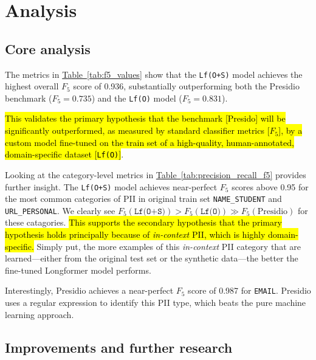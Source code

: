 \documentclass[11pt]{article}
\newcommand{\Tablink}[1]{\hyperref[#1]{Table~\ref*{#1}}}
\begin{document}
\section{Analysis} 

\subsection{Core analysis}

The metrics in \Tablink{tab:f5_values} show that the \texttt{Lf(O+S)} model achieves the highest overall $F_5$ score of 0.936, substantially outperforming both the Presidio benchmark ($F_5 = 0.735$) and the \texttt{Lf(O)} model ($F_5 = 0.831$).

\hl{This validates the primary hypothesis that the benchmark [Presido] will be significantly outperformed, as measured by standard classifier metrics [$F_5$], by a custom model fine-tuned on the train set of a high-quality, human-annotated, domain-specific dataset [\texttt{Lf(O)}]}.

Looking at the category-level metrics in \Tablink{tab:precision_recall_f5} provides further insight. The \texttt{Lf(O+S)} model achieves near-perfect $F_5$ scores above 0.95 for the most common categories of PII in original train set \texttt{NAME\_STUDENT} and \texttt{URL\_PERSONAL}. We clearly see \( F_5(\texttt{Lf(O+S)}) > F_5(\texttt{Lf(O)}) \gg F_5(\text{Presidio}) \) for these catagories. \hl{This supports the secondary hypothesis that the primary hypothesis holds principally because of \textit{in-context} PII, which is highly domain-specific.} Simply put, the more examples of this \textit{in-context} PII category that are learned—either from the original test set or the synthetic data—the better the fine-tuned Longformer model performs.

Interestingly, Presidio achieves a near-perfect $F_5$ score of 0.987 for \texttt{EMAIL}. Presidio uses a regular expression to identify this PII type, which beats the pure machine learning approach.

\subsection{Improvements and further research}
\end{document}
